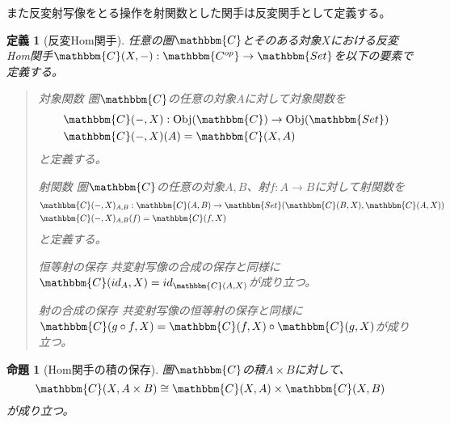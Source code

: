 \documentclass[uplatex,dvipdfmx]{jsarticle}
\newcommand{\cat}[1]{\mathbbm{#1}}
\newcommand{\arrow}{\rightarrow}
\newcommand{\functor}[3]{#1:\cat{#2}\arrow \cat{#3}}
\newcommand{\obj}[1]{\mathrm{Obj}(\cat{#1})}
\newcommand{\mor}[3]{#1:#2\arrow #3}
\newcommand{\arset}[3]{\cat{#1}(#2,#3)}
\newtheorem{prop}[proof]{命題}
\newtheorem{define}[proof]{定義}
\numberwithin{proof}{subsection}
\newenvironment{mydescription}
{\begin{description}
  \setlength{\parskip}{0.5cm}
}
{\end{description}}
\begin{document}
	また反変射写像をとる操作を射関数とした関手は反変関手として定義する。
		\begin{define}[反変Hom関手]
		任意の圏$\cat{C}$とそのある対象$X$における反変Hom関手$\functor{\arset{C}{X}{-}}{C^{op}}{Set}$を以下の要素で定義する。
		\begin{quote}
			\begin{mydescription}
				\item[対象関数] 圏$\cat{C}$の任意の対象$A$に対して対象関数を
				\begin{align*}
					&\mor{\arset{C}{-}{X}}{\obj{C}}{\obj{Set}}\\
					&\arset{C}{-}{X}(A)=\arset{C}{X}{A}
				\end{align*}
				と定義する。
				\item[射関数] 圏$\cat{C}$の任意の対象$A,B$、射$\mor{f}{A}{B}$に対して射関数を
				\begin{align*}
					&\mor{\arset{C}{-}{X}_{A,B}}{\arset{C}{A}{B}}{\arset{Set}{\arset{C}{B}{X}}{\arset{C}{A}{X}}}\\
					&\arset{C}{-}{X}_{A,B}(f)=\arset{C}{f}{X}
				\end{align*}
				と定義する。
				\begin{center}
				\end{center}
				\item[恒等射の保存] 共変射写像の合成の保存と同様に$\arset{C}{id_A}{X}=id_{\arset{C}{A}{X}}$が成り立つ。
				\item[射の合成の保存] 共変射写像の恒等射の保存と同様に$\arset{C}{g\circ f}{X}=\arset{C}{f}{X}\circ\arset{C}{g}{X}$が成り立つ。
			\end{mydescription}
		\end{quote}
	\end{define}
	\begin{prop}[Hom関手の積の保存]
		圏$\cat{C}$の積$A\times B$に対して、\[\arset{C}{X}{A\times B}\cong \arset{C}{X}{A}\times \arset{C}{X}{B}\]が成り立つ。
	\end{prop}
\end{document}
